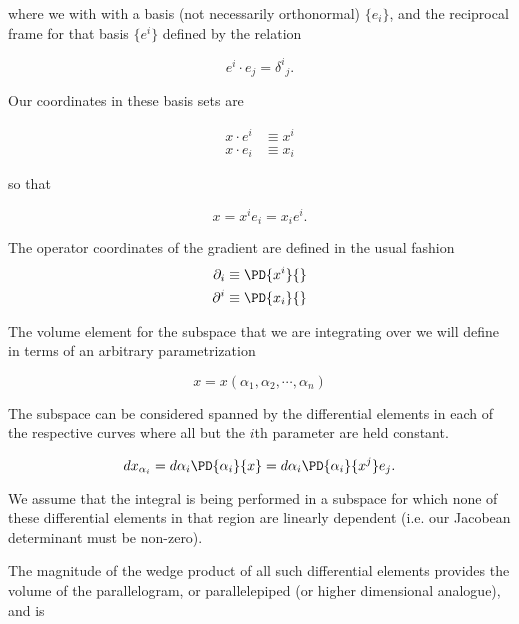where we with with a basis (not necessarily orthonormal) $\{e_i\}$, and the reciprocal frame for that basis $\{e^i\}$ defined by the relation

\begin{equation}\label{eqn:stokesTensor:50}
e^i \cdot e_j = {\delta^i}_j.
\end{equation}

Our coordinates in these basis sets are

\begin{align}\label{eqn:stokesTensor:70}
x \cdot e^i &\equiv x^i \\
x \cdot e_i &\equiv x_i
\end{align}

so that

\begin{equation}\label{eqn:stokesTensor:90}
x = x^i e_i = x_i e^i.
\end{equation}

The operator coordinates of the gradient are defined in the usual fashion
\begin{align}\label{eqn:stokesTensor:110}
\partial_i &\equiv \PD{x^i}{} \\
\partial^i &\equiv \PD{x_i}{}
\end{align}

The volume element for the subspace that we are integrating over we will define in terms of an arbitrary parametrization

\begin{equation}\label{eqn:stokesTensor:130}
x = x(\alpha_1, \alpha_2, \cdots, \alpha_n)
\end{equation}

The subspace can be considered spanned by the differential elements in each of the respective curves where all but the $i$th parameter are held constant.

\begin{equation}\label{eqn:stokesTensor:150}
dx_{\alpha_i}
= d\alpha_i \PD{\alpha_i}{x}
= d\alpha_i \PD{\alpha_i}{x^j} e_j.
\end{equation}

We assume that the integral is being performed in a subspace for which none of these differential elements in that region are linearly dependent (i.e. our Jacobean determinant must be non-zero).

The magnitude of the wedge product of all such differential elements provides the volume of the parallelogram, or parallelepiped (or higher dimensional analogue), and is


